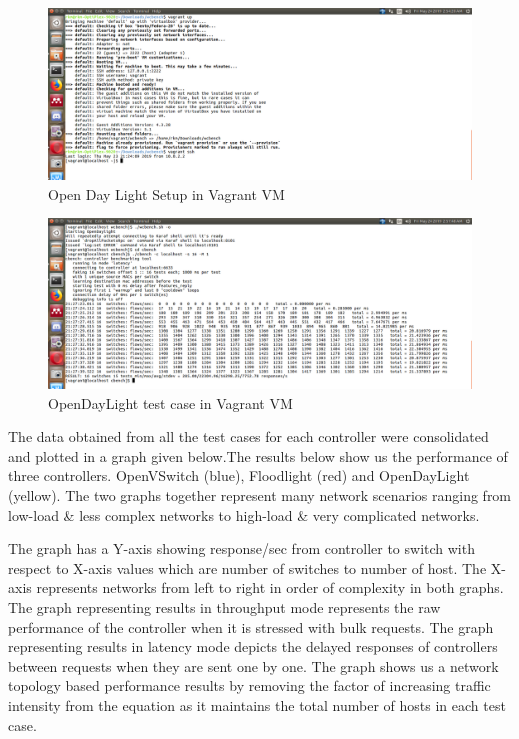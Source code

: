 \begin{figure}[!hbt]
        \centering
        \includegraphics[width=\textwidth,height=0.5\textwidth]{images/vagrant-up-ssh.png}
        \caption{Open Day Light Setup in Vagrant VM}
        \label{vagup}
\end{figure}

\begin{figure}[!hbt]
        \centering
        \includegraphics[width=\textwidth,keepaspectratio]{images/ODL-SSH-16-to-1.png}
        \caption{OpenDayLight test case in Vagrant VM}
        \label{vagrun}
\end{figure}
\vspace{5mm}
The data obtained from all the test cases for each controller were consolidated and plotted in a graph given below.The results below show us the performance of three controllers. OpenVSwitch (blue), Floodlight (red) and OpenDayLight (yellow). The two graphs together represent many network scenarios ranging from low-load \& less complex networks to high-load \& very complicated networks. 

The graph has a Y-axis showing response/sec from controller to switch with respect to X-axis values which are number of switches to number of host. The X-axis represents networks from left to right in order of complexity in both graphs. The graph representing results in throughput mode represents the raw performance of the controller when it is stressed with bulk requests. The graph representing results in latency mode depicts the delayed responses of controllers between requests when they are sent one by one.
The graph shows us a network topology based performance results by removing the factor of increasing traffic intensity from the equation as it maintains the total number of hosts in each test case.

